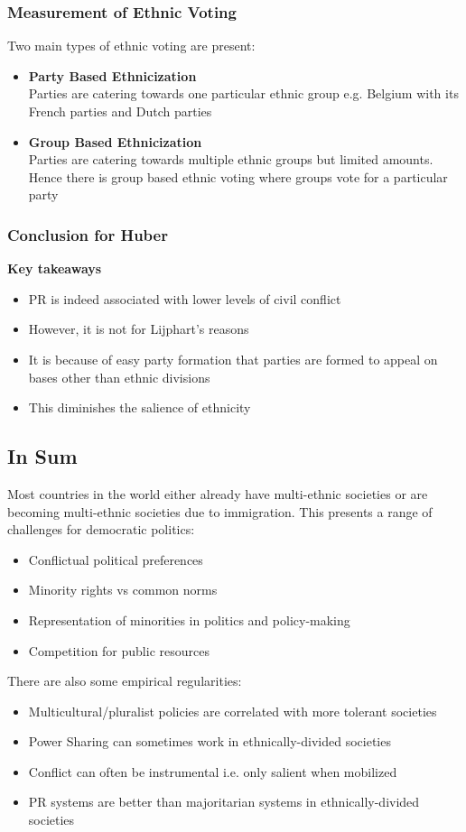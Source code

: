 \documentclass[12pt, letterpaper]{article}
\begin{document}
\subsubsection{Measurement of Ethnic Voting}
Two main types of ethnic voting are present:
\begin{itemize}
	\item \textbf{Party Based Ethnicization}\\
		Parties are catering towards one particular ethnic group e.g. Belgium with its French parties and Dutch parties
	\item \textbf{Group Based Ethnicization}\\
		Parties are catering towards multiple ethnic groups but limited amounts. Hence there is group based ethnic voting where groups vote for a particular party
\end{itemize}

\subsubsection{Conclusion for Huber}
\textbf{Key takeaways}
\begin{itemize}
	\item PR is indeed associated with lower levels of civil conflict
	\item However, it is not for Lijphart's reasons
	\item It is because of easy party formation that parties are formed to appeal on bases other than ethnic divisions
	\item This diminishes the salience of ethnicity
\end{itemize}
 
\subsection{In Sum}
Most countries in the world either already have multi-ethnic societies or are becoming multi-ethnic societies due to immigration. This presents a range of challenges for democratic politics:
\begin{itemize}
	\item Conflictual political preferences
	\item Minority rights vs common norms
	\item Representation of minorities in politics and policy-making
	\item Competition for public resources
\end{itemize}
There are also some empirical regularities:
\begin{itemize}
	\item Multicultural/pluralist policies are correlated with more tolerant societies
	\item Power Sharing can sometimes work in ethnically-divided societies
	\item Conflict can often be instrumental i.e. only salient when mobilized
	\item PR systems are better than majoritarian systems in ethnically-divided societies
\end{itemize}
\end{document}
